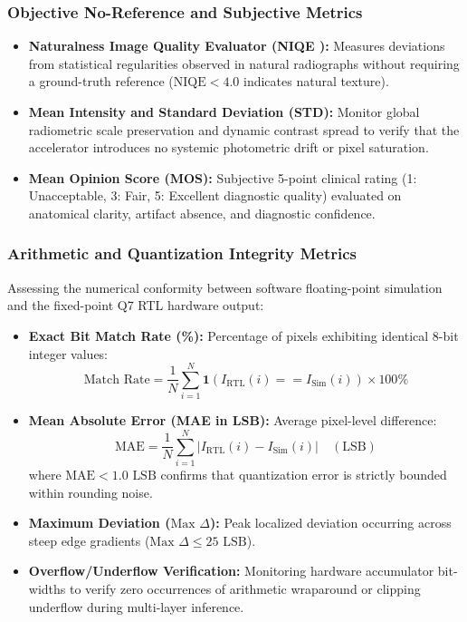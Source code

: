 \documentclass[conference]{IEEEtran}
\begin{document}
\subsubsection{Objective No-Reference and Subjective Metrics}
\begin{itemize}
    \item \textbf{Naturalness Image Quality Evaluator (NIQE \cite{mittal2012making}):} Measures deviations from statistical regularities observed in natural radiographs without requiring a ground-truth reference ($\text{NIQE} < 4.0$ indicates natural texture).
    \item \textbf{Mean Intensity and Standard Deviation (STD):} Monitor global radiometric scale preservation and dynamic contrast spread to verify that the accelerator introduces no systemic photometric drift or pixel saturation.
    \item \textbf{Mean Opinion Score (MOS):} Subjective 5-point clinical rating (1: Unacceptable, 3: Fair, 5: Excellent diagnostic quality) evaluated on anatomical clarity, artifact absence, and diagnostic confidence.
\end{itemize}

\subsubsection{Arithmetic and Quantization Integrity Metrics}
Assessing the numerical conformity between software floating-point simulation and the fixed-point Q7 RTL hardware output:
\begin{itemize}
    \item \textbf{Exact Bit Match Rate (\%):} Percentage of pixels exhibiting identical 8-bit integer values:
    \begin{equation}
        \text{Match Rate} = \frac{1}{N}\sum_{i=1}^N \mathbf{1}\left( I_{\text{RTL}}(i) == I_{\text{Sim}}(i) \right) \times 100\%
    \end{equation}
    \item \textbf{Mean Absolute Error (MAE in LSB):} Average pixel-level difference:
    \begin{equation}
        \text{MAE} = \frac{1}{N}\sum_{i=1}^N \left| I_{\text{RTL}}(i) - I_{\text{Sim}}(i) \right| \quad (\text{LSB})
    \end{equation}
    where $\text{MAE} < 1.0\text{ LSB}$ confirms that quantization error is strictly bounded within rounding noise.
    \item \textbf{Maximum Deviation ($\text{Max }\Delta$):} Peak localized deviation occurring across steep edge gradients ($\text{Max }\Delta \le 25\text{ LSB}$).
    \item \textbf{Overflow/Underflow Verification:} Monitoring hardware accumulator bit-widths to verify zero occurrences of arithmetic wraparound or clipping underflow during multi-layer inference.
\end{itemize}
\end{document}
